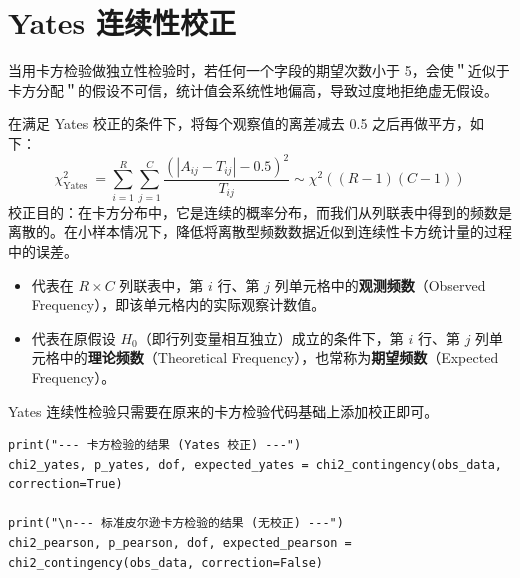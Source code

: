 \section{Yates 连续性校正}

\begin{definition}
    当用卡方检验做独立性检验时，若任何一个字段的期望次数小于 5，会使＂近似于卡方分配＂的假设不可信，统计值会系统性地偏高，导致过度地拒绝虚无假设。

    在满足 Yates 校正的条件下，将每个观察值的离差减去 0.5 之后再做平方，如下：
    $$
        \chi_{\text {Yates }}^2=\sum_{i=1}^R \sum_{j=1}^C \frac{\left(\left|A_{i j}-T_{i j}\right|-0.5\right)^2}{T_{i j}} \sim \chi^2((R-1)(C-1))
    $$
    校正目的：在卡方分布中，它是连续的概率分布，而我们从列联表中得到的频数是离散的。在小样本情况下，降低将离散型频数数据近似到连续性卡方统计量的过程中的误差。
    \begin{itemize}
        \item[\textbf{$A_{ij}$}:] 代表在 $R \times C$ 列联表中，第 $i$ 行、第 $j$ 列单元格中的\textbf{观测频数}（Observed Frequency），即该单元格内的实际观察计数值。

        \item[\textbf{$T_{ij}$}:] 代表在原假设 $H_0$（即行列变量相互独立）成立的条件下，第 $i$ 行、第 $j$ 列单元格中的\textbf{理论频数}（Theoretical Frequency），也常称为\textbf{期望频数}（Expected Frequency）。
    \end{itemize}
\end{definition}

Yates 连续性检验只需要在原来的卡方检验代码基础上添加校正即可。

\begin{lstlisting}[style=python]
print("--- 卡方检验的结果 (Yates 校正) ---")
chi2_yates, p_yates, dof, expected_yates = chi2_contingency(obs_data, correction=True)

print("\n--- 标准皮尔逊卡方检验的结果 (无校正) ---")
chi2_pearson, p_pearson, dof, expected_pearson = chi2_contingency(obs_data, correction=False)
\end{lstlisting}


